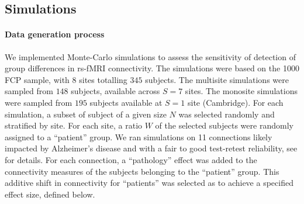 \documentclass[authoryear]{elsarticle}
\begin{document}
\subsection{Simulations}

\paragraph{Data generation process}
We implemented Monte-Carlo simulations to assess the sensitivity of detection of group differences in rs-fMRI connectivity. The simulations were based on the 1000 FCP sample, with 8 sites totalling $345$ subjects. The multisite simulations were sampled from $148$ subjects, available across $S=7$ sites. The monosite simulations were sampled from $195$ subjects available at $S=1$ site (Cambridge). For each simulation, a subset of subject of a given size $N$ was selected randomly and stratified by site. For each site, a ratio $W$ of the selected subjects were randomly assigned to a ``patient'' group. We ran simulations on 11 connections likely impacted by Alzheimer's disease and with a fair to good test-retest reliability, see \cite{Orban2015} for details. For each connection, a ``pathology'' effect was added to the connectivity measures of the subjects belonging to the ``patient'' group. This additive shift in connectivity for ``patients'' was selected as to achieve a specified effect size, defined below. 

% 
% 

\end{document}

